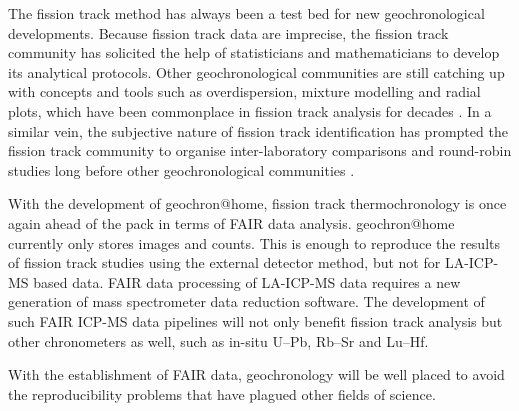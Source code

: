 \documentclass[gchron, manuscript]{copernicus}
\begin{document}
The fission track method has always been a test bed for new
geochronological developments.  Because fission track data are
imprecise, the fission track community has solicited the help of
statisticians and mathematicians to develop its analytical protocols.
Other geochronological communities are still catching up with concepts
and tools such as overdispersion, mixture modelling and radial plots,
which have been commonplace in fission track analysis for decades
\citep{vermeesch2019b}. In a similar vein, the subjective nature of
fission track identification has prompted the fission track community
to organise inter-laboratory comparisons and round-robin studies long
before other geochronological communities
\citep{miller1985,tamer2025}.\medskip

With the development of geochron@home, fission track thermochronology
is once again ahead of the pack in terms of FAIR data analysis.
geochron@home currently only stores images and counts. This is enough
to reproduce the results of fission track studies using the external
detector method, but not for LA-ICP-MS based data. FAIR data
processing of LA-ICP-MS data requires a new generation of mass
spectrometer data reduction software.  The development of such FAIR
ICP-MS data pipelines will not only benefit fission track analysis but
other chronometers as well, such as in-situ U--Pb, Rb--Sr and
Lu--Hf.\medskip

With the establishment of FAIR data, geochronology will be well placed
to avoid the reproducibility problems that have plagued other fields
of science.



\end{document}
